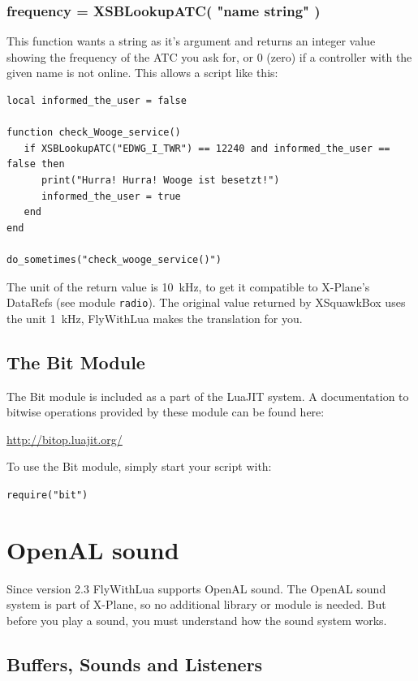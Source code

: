 \documentclass[11pt,parskip=half,a4paper]{scrartcl}
\begin{document}
\subsubsection{frequency = XSBLookupATC( "name string" )}

This function wants a string as it's argument and returns an integer value showing the frequency of the ATC you ask for, or 0 (zero) if a controller with the given name is not online. This allows a script like this:

\begin{lstlisting}
local informed_the_user = false

function check_Wooge_service()
   if XSBLookupATC("EDWG_I_TWR") == 12240 and informed_the_user == false then
      print("Hurra! Hurra! Wooge ist besetzt!")
      informed_the_user = true
   end
end

do_sometimes("check_wooge_service()")
\end{lstlisting}

The unit of the return value is 10~kHz, to get it compatible to X-Plane's DataRefs (see module \verb|radio|). The original value returned by XSquawkBox uses the unit 1~kHz, FlyWithLua makes the translation for you.

\subsection{The Bit Module}

The Bit module is included as a part of the LuaJIT system. A documentation to bitwise operations provided by these module can be found here:

\url{http://bitop.luajit.org/}

To use the Bit module, simply start your script with:

\verb|require("bit")|

\newpage
\section{OpenAL sound}

Since version 2.3 FlyWithLua supports OpenAL sound. The OpenAL sound system is part of X-Plane, so no additional library or module is needed. But before you play a sound, you must understand how the sound system works.

\subsection{Buffers, Sounds and Listeners}
\end{document}
